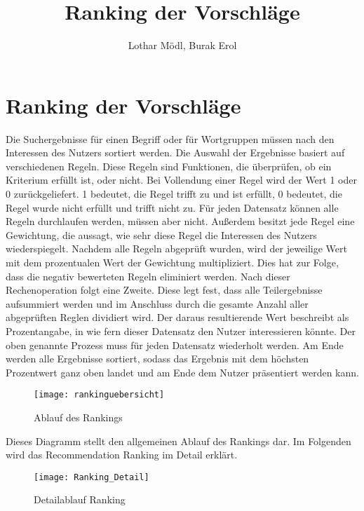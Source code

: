 
\title{Ranking der Vorschläge}
\author{Lothar Mödl, Burak Erol}

\chapter{Ranking der Vorschläge}

Die Suchergebnisse für einen Begriff oder  für Wortgruppen müssen nach den Interessen des Nutzers sortiert werden. Die Auswahl der Ergebnisse basiert auf verschiedenen Regeln. Diese Regeln sind Funktionen, die überprüfen, ob ein Kriterium erfüllt ist, oder nicht. Bei Vollendung einer Regel wird der Wert 1 oder 0 zurückgeliefert. 1 bedeutet, die Regel trifft zu und ist erfüllt, 0 bedeutet, die Regel wurde nicht erfüllt und trifft nicht zu. Für jeden Datensatz können alle Regeln durchlaufen werden, müssen aber nicht. Außerdem besitzt jede Regel eine Gewichtung, die aussagt, wie sehr diese Regel die Interessen des Nutzers wiederspiegelt. Nachdem alle Regeln abgeprüft wurden, wird der jeweilige Wert mit dem prozentualen Wert der Gewichtung multipliziert. Dies hat zur Folge, dass die negativ bewerteten Regeln eliminiert werden. Nach dieser Rechenoperation folgt eine Zweite. Diese legt fest, dass alle Teilergebnisse aufsummiert werden und im Anschluss durch die gesamte Anzahl aller abgeprüften Reglen dividiert wird. Der daraus resultierende Wert beschreibt als Prozentangabe, in wie fern dieser Datensatz den Nutzer interessieren könnte. Der oben genannte Prozess muss für jeden Datensatz wiederholt werden. Am Ende werden alle Ergebnisse sortiert, sodass das Ergebnis mit dem höchsten Prozentwert ganz oben landet und am Ende dem Nutzer präsentiert werden kann. 

\begin{figure}[h]
	\centering
	\texttt{[image: rankinguebersicht]}
	\caption{Ablauf des Rankings}
	\label{fig:Rankingablauf}
\end{figure}

Dieses Diagramm stellt den allgemeinen Ablauf des Rankings dar. Im Folgenden wird das Recommendation Ranking im Detail erklärt. 

\begin{figure}[h]
	\centering
	\texttt{[image: Ranking\_Detail]}
	\caption{Detailablauf Ranking}
	\label{fig:Detailablauf}
\end{figure}